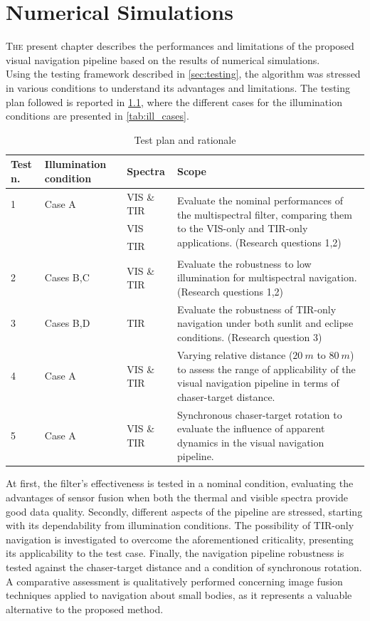 \chapter{Numerical Simulations}
\lettrine{T}{he} present chapter describes the performances and limitations of the proposed visual navigation pipeline based on the results of numerical simulations.\\
Using the testing framework described in \cref{sec:testing}, the algorithm was stressed in various conditions to understand its advantages and limitations. The testing plan followed is reported in \cref{tab:testplan}, where the different cases for the illumination conditions are presented in \cref{tab:ill_cases}. \\

\begin{table}[!h]

    \centering
    \begin{tabular}{p{1.5cm} p{2.5cm} p{2.5cm} p{7.3cm}}
        Test n. & Illumination condition &  Spectra  & Scope  \\
        \hline \hline
        1 & Case A & VIS \& TIR  & \multirow{3}{*}{\parbox{7.3cm}{Evaluate the nominal performances of the multispectral filter, comparing them to the VIS-only and TIR-only applications. (Research questions 1,2)}} \\ 
        &  & VIS & \\ 
        &   & TIR & \\ \hline
        2 & Cases B,C & VIS \& TIR & Evaluate the robustness to low illumination for multispectral navigation. (Research questions 1,2)\\ \hline
        3 & Cases B,D & TIR &  Evaluate the robustness of TIR-only navigation under both sunlit and eclipse conditions. (Research question 3)\\ \hline
        4 & Case A & VIS \& TIR & Varying relative distance ($\SI{20}{m}$ to $\SI{80}{m}$) to assess the range of applicability of the visual navigation pipeline in terms of chaser-target distance.\\ \hline
        5& Case A & VIS \& TIR & Synchronous chaser-target rotation to evaluate the influence of apparent dynamics in the visual navigation pipeline. \\ \hline
    \end{tabular}
    \caption{Test plan and rationale}
    \label{tab:testplan}
\end{table}
\newpage
At first, the filter's effectiveness is tested in a nominal condition, evaluating the advantages of sensor fusion when both the thermal and visible spectra provide good data quality.
Secondly, different aspects of the pipeline are stressed, starting with its dependability from illumination conditions. The possibility of TIR-only navigation is investigated to overcome the aforementioned criticality, presenting its applicability to the test case.
Finally, the navigation pipeline robustness is tested against the chaser-target distance and a condition of synchronous rotation. \\
A comparative assessment is qualitatively performed concerning image fusion techniques applied to navigation about small bodies, as it represents a valuable alternative to the proposed method.

